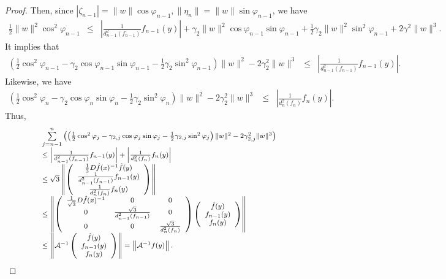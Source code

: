 \documentclass[12pt,oneside,reqno]{amsart}
\theoremstyle{definition}
\begin{document}
\begin{proof}
Then, since $|\zeta_{n-1}|=\|w\|\cos\varphi_{n-1}, \|\eta_n\|=\|w\|\sin\varphi_{n-1}$, we have
{\footnotesize
	\begin{eqnarray*}
	\frac{1}{2}\|w\|^2\cos^2\varphi_{n-1}& \leq & \left|\frac{1}{d_{n-1}^2(f_{n-1})}f_{n-1}(y)\right| + \gamma_2\|w\|^2\cos\varphi_{n-1}\sin\varphi_{n-1}+\frac{1}{2}\gamma_2\|w\|^2\sin^2\varphi_{n-1}+2\gamma^2\|w\|^3.
	\end{eqnarray*}
}
It implies that
{\footnotesize
\begin{eqnarray*}
\left(\frac{1}{2}\cos^2\varphi_{n-1}-\gamma_2\cos\varphi_{n-1}\sin\varphi_{n-1}-\frac{1}{2}\gamma_2\sin^2\varphi_{n-1}\right)\|w\|^2-2\gamma_2^2\|w\|^3&\leq & \left|\frac{1}{d_{n-1}^2(f_{n-1})}f_{n-1}(y)\right| .
\end{eqnarray*}}
Likewise, we have
{\footnotesize
	\begin{eqnarray*}
		\left(\frac{1}{2}\cos^2\varphi_{n}-\gamma_2\cos\varphi_{n}\sin\varphi_{n}-\frac{1}{2}\gamma_2\sin^2\varphi_{n}\right)\|w\|^2-2\gamma_2^2\|w\|^3&\leq & \left|\frac{1}{d_{n}^2(f_{n})}f_{n}(y)\right|.
		\end{eqnarray*}}
Thus,
$${\footnotesize
\begin{array}{l}
\sum\limits_{j=n-1}^n\left(\left(\frac{1}{2}\cos^2\varphi_{j}-\gamma_{2,j}\cos\varphi_j\sin\varphi_j-\frac{1}{2}\gamma_{2,j}\sin^2\varphi_j\right)\|w\|^2 -2\gamma_{2,j}^2\|w\|^3\right)\\
\leq \left|\frac{1}{d_{n-1}^2(f_{n-1})}f_{n-1}(y)\right| + \left|\frac{1}{d_{n}^2(f_{n})}f_{n}(y)\right| \\
\leq \sqrt{3}\left\|\left(\begin{array}{c}
\frac{1}{3}D\hat{f}(x)^{-1}\hat{f}(y)\\
\frac{1}{d_{n-1}^2(f_{n-1})}f_{n-1}(y)\\
\frac{1}{d_{n}^2(f_{n})}f_{n}(y)
\end{array}\right)\right\|\\
\leq \left\|\left(\begin{array}{ccc}
\frac{1}{\sqrt{3}}D\hat{f}(x)^{-1} & 0 & 0\\
0 & \frac{\sqrt{3}}{d_{n-1}^2(f_{n-1})} & 0 \\
0 & 0 & \frac{\sqrt{3}}{d_{n}^2(f_{n})}
\end{array}\right)\left(\begin{array}{c}
\hat{f}(y)\\
f_{n-1}(y)\\
f_n(y)
\end{array}\right)\right\|\\
\leq \left\|\mathcal{A}^{-1}\left(\begin{array}{c}
\hat{f}(y)\\
f_{n-1}(y)\\
f_n(y)
\end{array}\right)\right\|=\left\|\mathcal{A}^{-1}f(y)\right\|.
\end{array}}$$
\end{proof}
\end{document}
